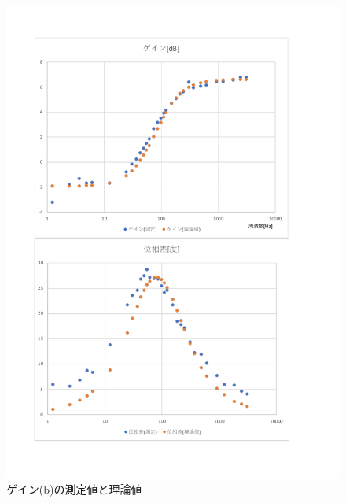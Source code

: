 \documentclass[uplatex, 11pt,a4j, titlepage]{jsarticle}
\begin{document}
\begin{figure}[h]
    \centering
    \includegraphics[width=12cm]{ideal_plot.pdf}
    \caption{ゲイン(b)の測定値と理論値}
    \label{ideal_plot}
\end{figure}
\end{document}
